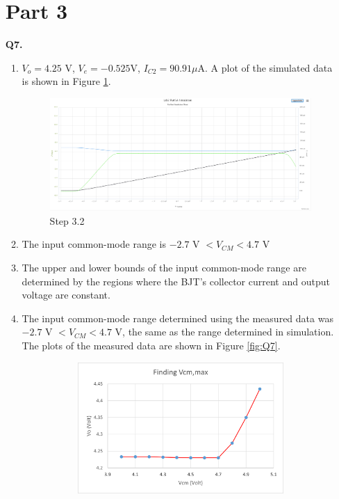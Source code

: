 \documentclass[12pt]{article}
\begin{document}
\begin{itemize}
    \section*{Part 3}
    \item [\textbf{Q7.}]
    \begin{enumerate}
        \item $V_o = 4.25$ V, $V_e = -0.525$V, $I_{C2} = 90.91\mu$A. A plot of the simulated data is shown in Figure \ref{fig:Step3.2}.
        \begin{figure}[!ht]
            \centering
            \includegraphics[width=\textwidth]{Step3.2}
            \caption{Step 3.2}
            \label{fig:Step3.2}
        \end{figure}
        \item The input common-mode range is $-2.7$ V $< V_{CM} < 4.7$ V
        \item The upper and lower bounds of the input common-mode range are determined by the regions where the BJT's collector current and output voltage are constant.
        \setcounter{enumi}{4} \item The input common-mode range determined using the measured data was $-2.7$ V $< V_{CM} < 4.7$ V, the same as the range determined in simulation. The plots of the measured data are shown in Figure \ref{fig:Q7}.
        \begin{figure}[!ht]
            \centering
            \begin{subfigure}[b]{0.46\textwidth}
                \centering
                \includegraphics[width=\textwidth]{Step3.10}

\end{subfigure}
\end{figure}
\end{enumerate}
\end{itemize}
\end{document}
